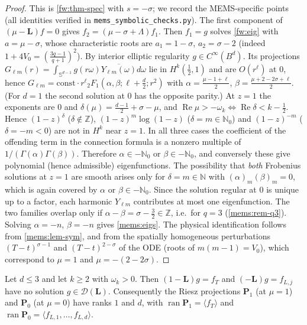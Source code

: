 \begin{proof}
This is \cref{fw:thm-spec} with $s=-\sigma$; we record the MEMS-specific
points (all identities verified in \texttt{mems\_symbolic\_checks.py}). The
first component of $(\mu-\mathbf L)f=0$ gives $f_2=(\mu-\sigma+\Lambda)f_1$. Then
$f_1=g$ solves \eqref{fw:eig} with $a=\mu-\sigma$, whose characteristic roots
are $a_1=1-\sigma$, $a_2=\sigma-2$ (indeed $1+4V_0=(\frac{3q-1}{q+1})^2$). By interior
elliptic regularity $g\in C^\infty(B^d)$. Its projections
$G_{\ell m}(r)=\int_{\mathbb S^{d-1}}g(r\omega)\overline{Y_{\ell m}(\omega)}d\omega$ lie in
$H^k(\frac12,1)$ and are $O(r^\ell)$ at $0$, hence $G_{\ell m}=\mathrm{const}\cdot
r^\ell{}_2F_1(\alpha,\beta;\ell+\frac d2;r^2)$ with
$\alpha=\frac{\mu-1+\ell}{2}$, $\beta=\frac{\mu+2-2\sigma+\ell}{2}$. (For $d=1$ the
second solution at $0$ has the opposite parity.) At $z=1$ the exponents are
$0$ and $\delta(\mu)=\frac{d-1}2+\sigma-\mu$, and
$\operatorname{Re}\mu>-\omega_k\iff\operatorname{Re}\delta<k-\frac12$. Hence
$(1-z)^{\delta}$ ($\delta\notin\mathbb Z$), $(1-z)^{m}\log(1-z)$ ($\delta=m\in\mathbb N_0$)
and $(1-z)^{-m}$ ($\delta=-m<0$) are not in $H^k$ near $z=1$. In all three
cases the coefficient of the offending term in the connection formula
\cite[15.8]{DLMF} is a nonzero multiple of $1/(\Gamma(\alpha)\Gamma(\beta))$.
Therefore $\alpha\in-\mathbb N_0$ or $\beta\in-\mathbb N_0$, and conversely these
give polynomial (hence admissible) eigenfunctions. The possibility that
\emph{both} Frobenius solutions at $z=1$ are smooth arises only for
$\delta=m\in\mathbb N$ with $(\alpha)_m(\beta)_m=0$, which is again covered by
$\alpha$ or $\beta\in-\mathbb N_0$. Since the solution regular at $0$ is
unique up to a factor, each harmonic $Y_{\ell m}$ contributes at most one
eigenfunction. The two families overlap only if $\alpha-\beta=\sigma-\frac32\in\mathbb Z$,
i.e.\ for $q=3$ (\cref{mems:rem-q3}). Solving $\alpha=-n$, $\beta=-n$ gives \eqref{mems:eigs}. The physical
identification follows from \cref{mems:lem-sym}, and from the spatially
homogeneous perturbations $(T-t)^{\sigma-1}$ and $(T-t)^{2-\sigma}$ of the ODE
(roots of $m(m-1)=V_0$), which correspond to $\mu=1$ and $\mu=-(2-2\sigma)$.
\end{proof}

\begin{lemma}[Semisimplicity]\label{mems:lem-jordan}
Let $d\le3$ and let $k\ge2$ with $\omega_k>0$. Then $(1-\mathbf L)g=f_T$ and
$(-\mathbf L)g=f_{L,j}$ have no solution $g\in\mathcal D(\mathbf L)$. Consequently the
Riesz projections $\mathbf P_1$ (at $\mu=1$) and $\mathbf P_0$ (at $\mu=0$) have
ranks $1$ and $d$, with $\operatorname{ran}\mathbf P_1=\langle f_T\rangle$ and
$\operatorname{ran}\mathbf P_0=\langle f_{L,1},\dots,f_{L,d}\rangle$.
\end{lemma}

